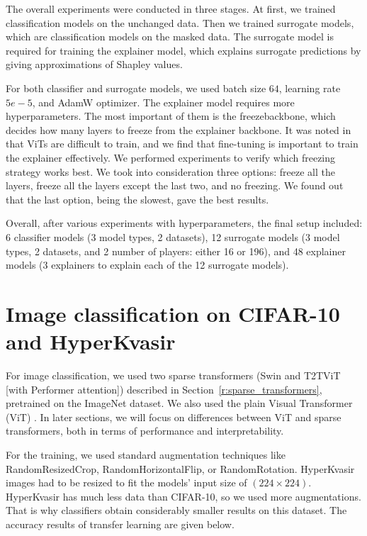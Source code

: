 \documentclass[en]{pracamgr}
\begin{document}
The overall experiments were conducted in three stages. At first, we trained classification models on the unchanged data. Then we trained surrogate models, which are classification models on the masked data. The surrogate model is required for training the explainer model, which explains surrogate predictions by giving approximations of Shapley values.

For both classifier and surrogate models, we used batch size $64$, learning rate $5e-5$, and AdamW optimizer. The explainer model requires more hyperparameters. The most important of them is the freeze\textunderscore backbone, which decides how many layers to freeze from the explainer backbone. It was noted in \cite{DBLP:conf/iclr/Covert0L23} that ViTs are difficult to train, and we find that fine-tuning is important to train the explainer effectively. We performed experiments to verify which freezing strategy works best. We took into consideration three options: freeze all the layers, freeze all the layers except the last two, and no freezing. We found out that the last option, being the slowest, gave the best results.

Overall, after various experiments with hyperparameters, the final setup included: 6 classifier models (3 model types, 2 datasets), 12 surrogate models (3 model types, 2 datasets, and 2 number of players: either 16 or 196), and 48 explainer models (3 explainers to explain each of the 12 surrogate models).


\section{Image classification on CIFAR-10 and HyperKvasir}

For image classification, we used two sparse transformers (Swin and T2T\textunderscore ViT [with Performer attention]) described in Section~\ref{r:sparse_transformers}, pretrained on the ImageNet dataset.
We also used the plain Visual Transformer (ViT) \cite{DBLP:conf/iclr/DosovitskiyB0WZ21}. In later sections, we will focus on differences between ViT and sparse transformers, both in terms of performance and interpretability.

For the training, we used standard augmentation techniques like RandomResizedCrop, RandomHorizontalFlip, or RandomRotation. HyperKvasir images had to be resized to fit the models' input size of $(224\times 224)$. HyperKvasir has much less data than CIFAR-10, so we used more augmentations. That is why classifiers obtain considerably smaller results on this dataset.
The accuracy results of transfer learning are given below.
\end{document}
